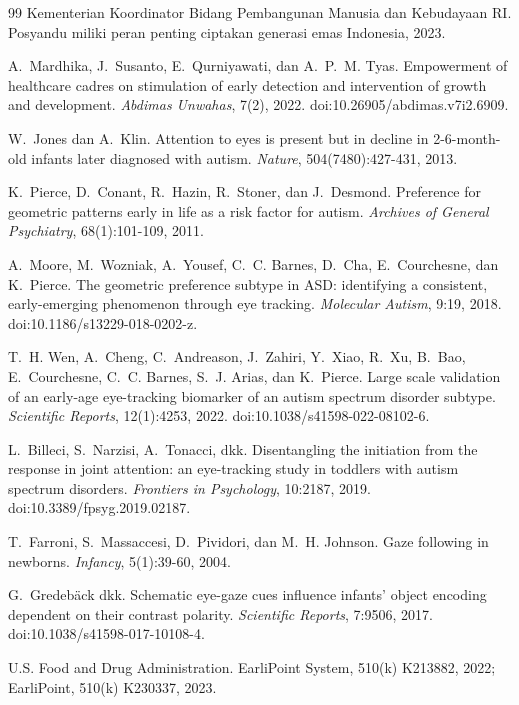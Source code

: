 \documentclass{article}
\begin{document}
\begin{thebibliography}{99}
Kementerian Koordinator Bidang Pembangunan Manusia dan Kebudayaan RI. Posyandu miliki peran
penting ciptakan generasi emas Indonesia, 2023.

A.~Mardhika, J.~Susanto, E.~Qurniyawati, dan A.~P.~M. Tyas. Empowerment of healthcare cadres
on stimulation of early detection and intervention of growth and development. \emph{Abdimas
Unwahas}, 7(2), 2022. doi:10.26905/abdimas.v7i2.6909.

W.~Jones dan A.~Klin. Attention to eyes is present but in decline in 2-6-month-old infants
later diagnosed with autism. \emph{Nature}, 504(7480):427-431, 2013.

K.~Pierce, D.~Conant, R.~Hazin, R.~Stoner, dan J.~Desmond. Preference for geometric patterns
early in life as a risk factor for autism. \emph{Archives of General Psychiatry},
68(1):101-109, 2011.

A.~Moore, M.~Wozniak, A.~Yousef, C.~C. Barnes, D.~Cha, E.~Courchesne, dan K.~Pierce.
The geometric preference subtype in ASD: identifying a consistent, early-emerging
phenomenon through eye tracking. \emph{Molecular Autism}, 9:19, 2018.
doi:10.1186/s13229-018-0202-z.

T.~H. Wen, A.~Cheng, C.~Andreason, J.~Zahiri, Y.~Xiao, R.~Xu, B.~Bao, E.~Courchesne,
C.~C. Barnes, S.~J. Arias, dan K.~Pierce. Large scale validation of an early-age
eye-tracking biomarker of an autism spectrum disorder subtype. \emph{Scientific Reports},
12(1):4253, 2022. doi:10.1038/s41598-022-08102-6.

L.~Billeci, S.~Narzisi, A.~Tonacci, dkk. Disentangling the initiation from the response
in joint attention: an eye-tracking study in toddlers with autism spectrum disorders.
\emph{Frontiers in Psychology}, 10:2187, 2019. doi:10.3389/fpsyg.2019.02187.

T.~Farroni, S.~Massaccesi, D.~Pividori, dan M.~H. Johnson. Gaze following in newborns.
\emph{Infancy}, 5(1):39-60, 2004.

G.~Gredeb\"ack dkk. Schematic eye-gaze cues influence infants' object encoding dependent
on their contrast polarity. \emph{Scientific Reports}, 7:9506, 2017.
doi:10.1038/s41598-017-10108-4.


U.S. Food and Drug Administration. EarliPoint System, 510(k) K213882, 2022; EarliPoint,
510(k) K230337, 2023.


\end{thebibliography}
\end{document}
